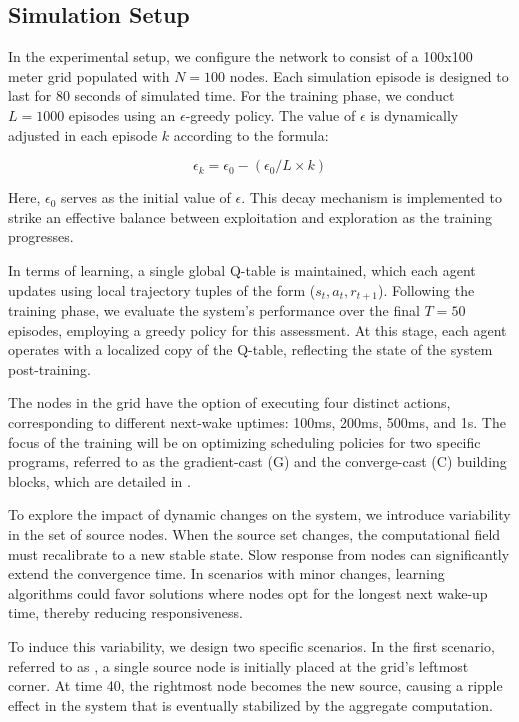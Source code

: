 \subsection{Simulation Setup}\label{acsos2022:s:simulation-setup}
In the experimental setup, we configure the network to consist of a 100x100 meter grid populated with $N=100$ nodes. 
 Each simulation episode is designed to last for 80 seconds of simulated time. 
 For the training phase, we conduct $L=1000$ episodes using an $\epsilon$-greedy policy. 
 The value of $\epsilon$ is dynamically adjusted in each episode $k$ according to the formula:

\begin{equation}
\epsilon_k = \epsilon_0 - (\epsilon_0 / L \times k)
\end{equation}

Here, $\epsilon_0$ serves as the initial value of $\epsilon$. 
 This decay mechanism is implemented to strike an effective balance between exploitation and exploration as the training progresses.

In terms of learning, 
 a single global Q-table is maintained, 
 which each agent updates using local trajectory tuples of the form ($s_t, a_t, r_{t+1}$). 
 Following the training phase, we evaluate the system's performance over the final $T=50$ episodes, 
 employing a greedy policy for this assessment. 
 At this stage, each agent operates with a localized copy of the Q-table, reflecting the state of the system post-training.

The nodes in the grid have the option of executing four distinct actions, corresponding to different next-wake uptimes: 
 100ms, 200ms, 500ms, and 1s. 
 The focus of the training will be on optimizing scheduling policies for two specific programs, 
 referred to as the gradient-cast (G) and the converge-cast (C) building blocks, which are detailed in .

To explore the impact of dynamic changes on the system, 
 we introduce variability in the set of source nodes. 
 When the source set changes, the computational field must recalibrate to a new stable state. 
 Slow response from nodes can significantly extend the convergence time. 
 In scenarios with minor changes, 
 learning algorithms could favor solutions where nodes opt for the longest next wake-up time, thereby reducing responsiveness.

 To induce this variability, 
 we design two specific scenarios. 
 In the first scenario, referred to as \swapscen{}, a single source node is initially placed at the grid's leftmost corner. At time 40, the rightmost node becomes the new source, causing a ripple effect in the system that is eventually stabilized by the aggregate computation.
 
